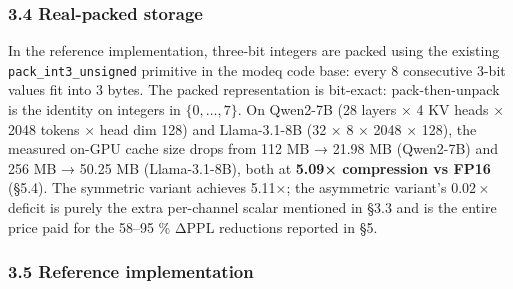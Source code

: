 \documentclass[
]{article}
\begin{document}
\subsubsection{3.4 Real-packed storage}\label{real-packed-storage}

In the reference implementation, three-bit integers are packed using the
existing \texttt{pack\_int3\_unsigned} primitive in the modeq code base:
every 8 consecutive 3-bit values fit into 3 bytes. The packed
representation is bit-exact: pack-then-unpack is the identity on
integers in \(\{0, \dots, 7\}\). On Qwen2-7B (28 layers × 4 KV heads ×
2048 tokens × head dim 128) and Llama-3.1-8B (32 × 8 × 2048 × 128), the
measured on-GPU cache size drops from 112 MB → 21.98 MB (Qwen2-7B) and
256 MB → 50.25 MB (Llama-3.1-8B), both at \textbf{5.09× compression vs
FP16} (§5.4). The symmetric variant achieves 5.11×; the asymmetric
variant's \(0.02\times\) deficit is purely the extra per-channel scalar
mentioned in §3.3 and is the entire price paid for the 58--95 \% ΔPPL
reductions reported in §5.

\subsubsection{3.5 Reference
implementation}\label{reference-implementation}
\end{document}
